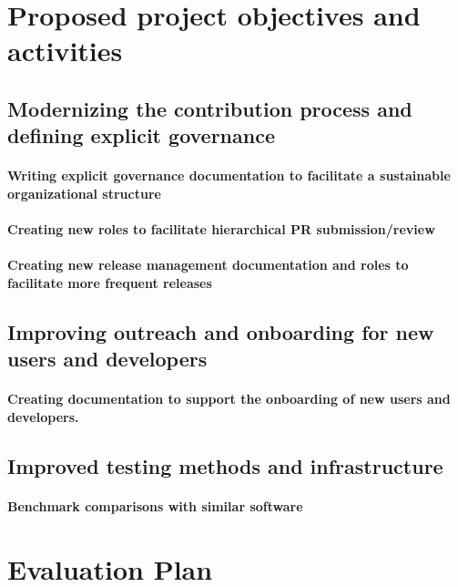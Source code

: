 \documentclass[numbers]{proposalnsf}
\begin{document}
\section{Proposed project objectives and activities}

\subsection{Modernizing the contribution process and defining explicit governance}


\paragraph{Writing explicit governance documentation to facilitate a sustainable organizational structure}

\paragraph{Creating new roles to facilitate hierarchical PR submission/review}

\paragraph{Creating new release management documentation and roles to facilitate more frequent releases}

\subsection{Improving outreach and onboarding for new users and developers}

\paragraph{Creating documentation to support the onboarding of new users and developers.} \label{sec:doc}

\subsection{Improved testing methods and infrastructure}

\paragraph{Benchmark comparisons with similar software}


\section{Evaluation Plan} \label{sec:eval}
\end{document}
